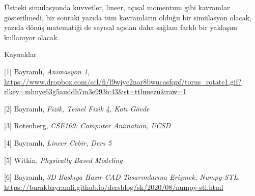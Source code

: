 \documentclass[12pt,fleqn]{article}\usepackage{../../common}
\begin{document}
Üstteki simülasyonda kuvvetler, lineer, açısal momentum gibi kavramlar
gösterilmedi, bir sonraki yazıda tüm kavramların olduğu bir simülasyon olacak,
yazıda dönüş matematiği de sayısal açıdan daha sağlam farklı bir yaklaşım
kullanıyor olacak.  

Kaynaklar

[1] Bayramlı, {\em Animasyon 1},
    \url{https://www.dropbox.com/scl/fi/l9wjyc2nar8bwucasfqpf/torus_rotate1.gif?rlkey=mhnye63g5auddh7m3e993ic43&st=ttluuezu&raw=1}

[2] Bayramlı, {\em Fizik, Temel Fizik 4, Katı Gövde}

[3] Rotenberg, {\em CSE169: Computer Animation, UCSD}

[4] Bayramlı, {\em Lineer Cebir, Ders 5}

[5] Witkin, {\em Physically Based Modeling}

[6] Bayramlı, {\em 3D Baskıya Hazır CAD Tasarımlarına Erişmek, Numpy-STL},
    \url{https://burakbayramli.github.io/dersblog/sk/2020/08/numpy-stl.html}
\end{document}
